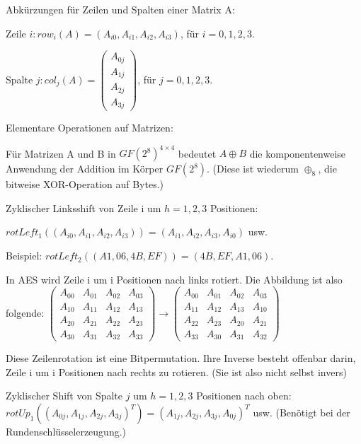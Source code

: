 \documentclass[a4paper]{article}
\begin{document}
\begin{multicols}{3}
    Abkürzungen für Zeilen und Spalten einer Matrix A:
    \begin{itemize*}
        \item Zeile $i: row_i(A)=(A_{i0},A_{i1},A_{i2} ,A_{i3})$, für $i=0,1,2,3$.
        \item Spalte $j:col_j(A)=\begin{pmatrix} A_{0j}\\ A_{1j}\\ A_{2j}\\ A_{3j} \end{pmatrix}$, für $j=0,1,2,3$.
    \end{itemize*}

    Elementare Operationen auf Matrizen:
    \begin{itemize*}
        \item Für Matrizen A und B in $GF(2^8)^{4\times 4}$ bedeutet $A\oplus B$ die komponentenweise Anwendung der Addition im Körper $GF(2^8)$. (Diese ist wiederum $\oplus_8$, die bitweise XOR-Operation auf Bytes.)
        \item Zyklischer Linksshift von Zeile i um $h=1,2,3$ Positionen:
        \item $rotLeft_1((A_{i0}, A_{i1}, A_{i2}, A_{i3})) =(A_{i1}, A_{i2}, A_{i3}, A_{i0})$ usw.
        \item Beispiel: $rotLeft_2((A1,06,4B,EF)) = (4B,EF,A1,06)$.
        \item In AES wird Zeile i um i Positionen nach links rotiert. Die Abbildung ist also folgende: $\begin{pmatrix} A_{00}& A_{01}& A_ {02}& A_{03}\\ A_{10}& A_{11}& A_{12}& A_{13}\\ A_{20}& A_{21}& A_{22}& A_{23}\\ A_{30}& A_{31}& A_{32}& A_{33}\end{pmatrix} \rightarrow \begin{pmatrix} A_{00}& A_{01}& A_{02}& A_{03}\\ A_{11}& A_{12}& A_{13}& A_{10}\\ A_{22}& A_{23}& A_{20}& A_{21}\\ A_{33}& A_{30}& A_{31}& A_{32}\end{pmatrix}$
        \item Diese Zeilenrotation ist eine Bitpermutation. Ihre Inverse besteht offenbar darin, Zeile i um i Positionen nach rechts zu rotieren. (Sie ist also nicht selbst invers)
        \item Zyklischer Shift von Spalte $j$ um $h=1,2,3$ Positionen nach oben: $rotUp_1((A_{0j},A_{1j},A_{2j},A_{3j})^T) = (A_{1j},A_{2j},A_{3j},A_{0j})^T$ usw. (Benötigt bei der Rundenschlüsselerzeugung.)

\end{itemize*}
\end{multicols}
\end{document}
